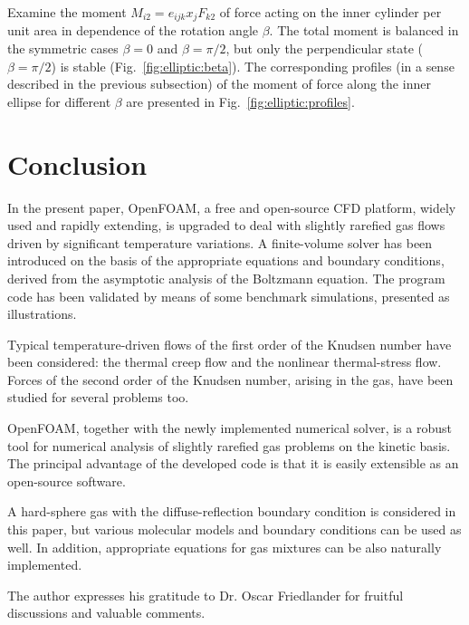 \documentclass[smallextended, final]{svjour3} %
\begin{document}
Examine the moment \(M_{i2} = e_{ijk}x_jF_{k2}\) of force acting on the inner cylinder
per unit area in dependence of the rotation angle \(\beta\).
The total moment is balanced in the symmetric cases \(\beta=0\) and \(\beta=\pi/2\),
but only the perpendicular state (\(\beta=\pi/2\)) is stable (Fig.~\ref{fig:elliptic:beta}).
The corresponding profiles (in a sense described in the previous subsection)
of the moment of force along the inner ellipse for different \(\beta\)
are presented in Fig.~\ref{fig:elliptic:profiles}.

\section{Conclusion}

In the present paper, OpenFOAM\textregistered{}, a free and open-source CFD platform,
widely used and rapidly extending, is upgraded to deal with
slightly rarefied gas flows driven by significant temperature variations.
A finite-volume solver has been introduced on the basis of the appropriate
equations and boundary conditions, derived from the asymptotic analysis of the Boltzmann equation.
The program code has been validated by means of some benchmark simulations,
presented as illustrations.

Typical temperature-driven flows of the first order of the Knudsen number have been considered:
the thermal creep flow and the nonlinear thermal-stress flow.
Forces of the second order of the Knudsen number, arising in the gas,
have been studied for several problems too.

OpenFOAM\textregistered{}, together with the newly implemented numerical solver,
is a robust tool for numerical analysis of slightly rarefied gas problems
on the kinetic basis. The principal advantage of the developed code is that
it is easily extensible as an open-source software.

A hard-sphere gas with the diffuse-reflection boundary condition is considered in this paper,
but various molecular models and boundary conditions can be used as well.
In addition, appropriate equations for gas mixtures can be also naturally implemented.

\begin{acknowledgements}
The author expresses his gratitude to Dr. Oscar Friedlander
for fruitful discussions and valuable comments.
\end{acknowledgements}


\end{document}
